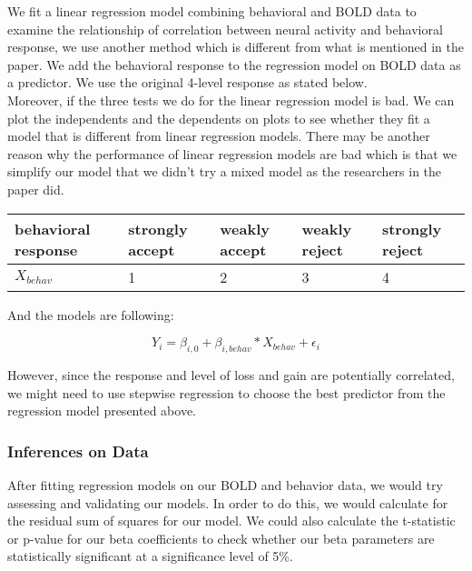 We fit a linear regression model combining behavioral and BOLD data to examine the relationship of correlation between neural activity and behavioral response, we use another method which is different from what is mentioned in the paper. We add the behavioral response to the regression model on BOLD data as a predictor. We use the original 4-level response as stated below. \\ 

Moreover, if the three tests we do for the linear regression model is bad. We can plot the independents and the dependents on plots to see whether they fit a model that is different from linear regression models. There may be another reason why the performance of linear regression models are bad which is that we simplify our model that we didn’t try a mixed model as the researchers in the paper did.

\begin{tabular}{lllll}
\hline
behavioral response & strongly accept & weakly accept & weakly reject & strongly reject\\ 
\hline
$X_{behav}$ & 1 & 2 & 3 & 4 \\
\hline
\end{tabular}

And the models are following:

\begin{equation}
Y_{i} = \beta_{i, 0} + \beta_{i, behav} * X_{behav} + \epsilon_i
\end{equation}

However, since the response and level of loss and gain are potentially correlated, we might need to use stepwise regression to choose the best predictor from the regression model presented above.

\subsubsection{Inferences on Data}
\indent \indent After fitting regression models on our BOLD and behavior data, we would try assessing and validating our models. In order to do this, we would calculate for the residual sum of squares for our model. We could also calculate the t-statistic or p-value for our beta coefficients to check whether our beta parameters are statistically significant at a significance level of 5\%.
